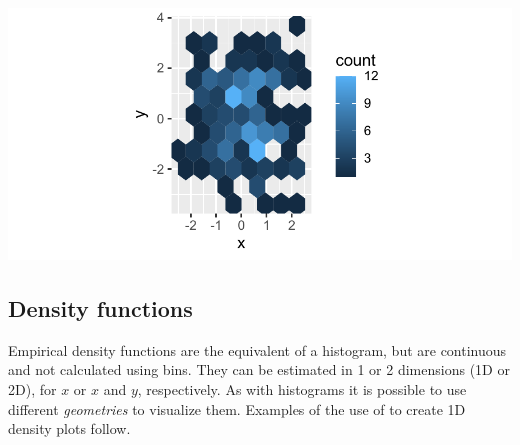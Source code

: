 \documentclass[krantz2]{krantz}\usepackage{knitr}
\begin{document}
\begin{knitrout}\footnotesize
{}\color{fgcolor}\begin{kframe}
\begin{alltt}
  \hlopt{+}
  \hlstd{(} \hlstd{=} \hlstd{)} \hlopt{+}
  \hlstd{(} \hlstd{=} \hlstd{)}
\end{alltt}
\end{kframe}

{\centering \includegraphics[width=.7\textwidth]{figure/pos-hex-plot-01-1}

}



\end{knitrout}

\subsection{Density functions}\label{sec:plot:density}
Empirical density functions are the equivalent of a histogram, but are continuous and not calculated using bins. They can be estimated in 1 or 2 dimensions (1D or 2D), for $x$ or $x$ and $y$, respectively. As with histograms it is possible to use different \emph{geometries} to visualize them. Examples of the use of  to create 1D density plots follow.
\end{document}
